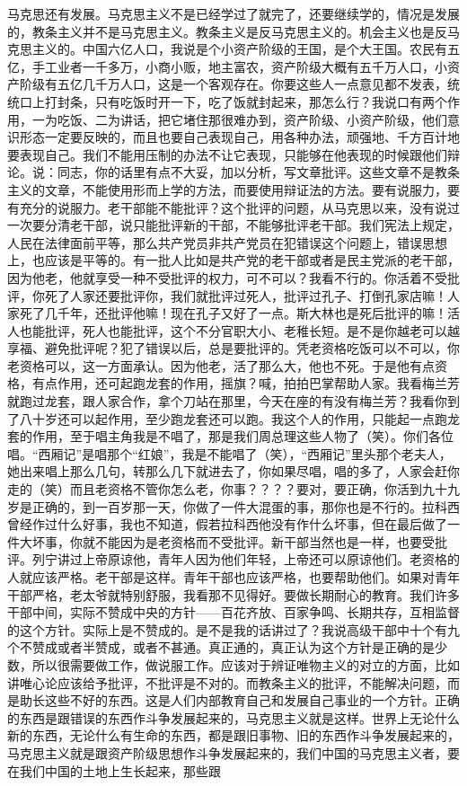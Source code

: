 马克思还有发展。马克思主义不是已经学过了就完了，还要继续学的，情况是发展的，教条主义并不是马克思主义。教条主义是反马克思主义的。机会主义也是反马克思主义的。中国六亿人口，我说是个小资产阶级的王国，是个大王国。农民有五亿，手工业者一千多万，小商小贩，地主富农，资产阶级大概有五千万人口，小资产阶级有五亿几千万人口，这是一个客观存在。你要这些人一点意见都不发表，统统口上打封条，只有吃饭时开一下，吃了饭就封起来，那怎么行？我说口有两个作用，一为吃饭、二为讲话，把它堵住那很难办到，资产阶级、小资产阶级，他们意识形态一定要反映的，而且也要自己表现自己，用各种办法，顽强地、千方百计地要表现自己。我们不能用压制的办法不让它表现，只能够在他表现的时候跟他们辩论。说：同志，你的话里有点不大妥，加以分析，写文章批评。这些文章不是教条主义的文章，不能使用形而上学的方法，而要使用辩证法的方法。要有说服力，要有充分的说服力。老干部能不能批评？这个批评的问题，从马克思以来，没有说过一次要分清老干部，说只能批评新的干部，不能够批评老干部。我们宪法上规定，人民在法律面前平等，那么共产党员非共产党员在犯错误这个问题上，错误思想上，也应该是平等的。有一批人比如是共产党的老干部或者是民主党派的老干部，因为他老，他就享受一种不受批评的权力，可不可以？我看不行的。你活着不受批评，你死了人家还要批评你，我们就批评过死人，批评过孔子、打倒孔家店嘛！人家死了几千年，还批评他嘛！现在孔子又好了一点。斯大林也是死后批评的嘛！活人也能批评，死人也能批评，这个不分官职大小、老稚长短。是不是你越老可以越享福、避免批评呢？犯了错误以后，总是要批评的。凭老资格吃饭可以不可以，你老资格可以，这一方面承认。因为他老，活了那么大，他也不死。于是他有点资格，有点作用，还可起跑龙套的作用，摇旗？喊，拍拍巴掌帮助人家。我看梅兰芳就跑过龙套，跟人家合作，拿个刀站在那里，今天在座的有没有梅兰芳？我看你到了八十岁还可以起作用，至少跑龙套还可以跑。我这个人的作用，只能起一点跑龙套的作用，至于唱主角我是不唱了，那是我们周总理这些人物了（笑）。你们各位唱。“西厢记”是唱那个“红娘”，我是不能唱了（笑），“西厢记”里头那个老夫人，她出来唱上那么几句，转那么几下就进去了，你如果尽唱，唱的多了，人家会赶你走的（笑）而且老资格不管你怎么老，你事？？？？要对，要正确，你活到九十九岁是正确的，到一百岁那一天，你做了一件大混蛋的事，那你也是不行的。拉科西曾经作过什么好事，我也不知道，假若拉科西他没有作什么坏事，但在最后做了一件大坏事，你就不能因为是老资格而不受批评。新干部当然也是一样，也要受批评。列宁讲过上帝原谅他，青年人因为他们年轻，上帝还可以原谅他们。老资格的人就应该严格。老干部是这样。青年干部也应该严格，也要帮助他们。如果对青年干部严格，老太爷就特别舒服，我看那不见得好。要做长期耐心的教育。我们许多干部中间，实际不赞成中央的方针——百花齐放、百家争鸣、长期共存，互相监督的这个方针。实际上是不赞成的。是不是我的话讲过了？我说高级干部中十个有九个不赞成或者半赞成，或者不甚通。真正通的，真正认为这个方针是正确的是少数，所以很需要做工作，做说服工作。应该对于辨证唯物主义的对立的方面，比如讲唯心论应该给予批评，不批评是不对的。而教条主义的批评，不能解决问题，而是助长这些不好的东西。这是人们内部教育自己和发展自己事业的一个方针。正确的东西是跟错误的东西作斗争发展起来的，马克思主义就是这样。世界上无论什么新的东西，无论什么有生命的东西，都是跟旧事物、旧的东西作斗争发展起来的，马克思主义就是跟资产阶级思想作斗争发展起来的，我们中国的马克思主义者，要在我们中国的土地上生长起来，那些跟